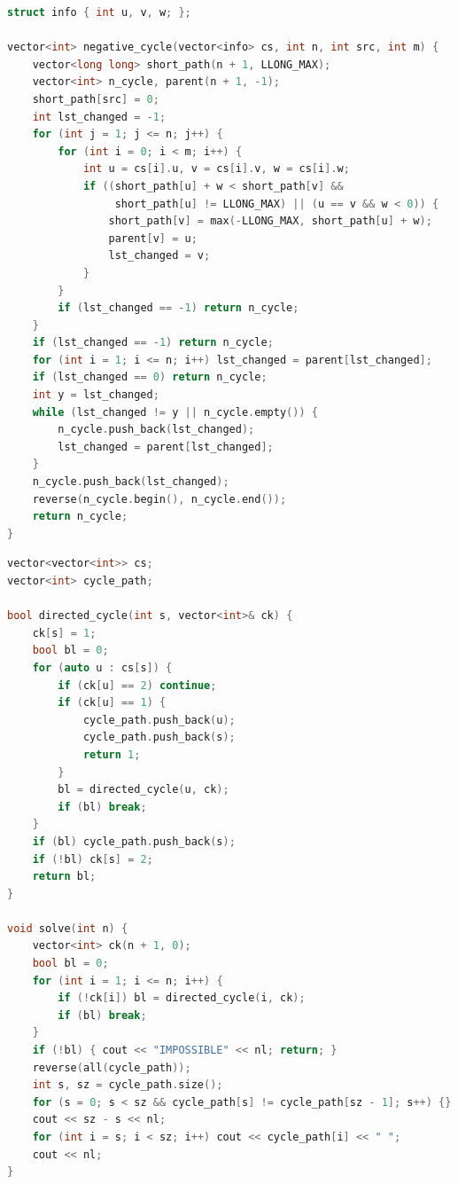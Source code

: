 \begin{lstlisting}[language=C++]
struct info { int u, v, w; };

vector<int> negative_cycle(vector<info> cs, int n, int src, int m) {
    vector<long long> short_path(n + 1, LLONG_MAX);
    vector<int> n_cycle, parent(n + 1, -1);
    short_path[src] = 0;
    int lst_changed = -1;
    for (int j = 1; j <= n; j++) {
        for (int i = 0; i < m; i++) {
            int u = cs[i].u, v = cs[i].v, w = cs[i].w;
            if ((short_path[u] + w < short_path[v] &&
                 short_path[u] != LLONG_MAX) || (u == v && w < 0)) {
                short_path[v] = max(-LLONG_MAX, short_path[u] + w);
                parent[v] = u;
                lst_changed = v;
            }
        }
        if (lst_changed == -1) return n_cycle;
    }
    if (lst_changed == -1) return n_cycle;
    for (int i = 1; i <= n; i++) lst_changed = parent[lst_changed];
    if (lst_changed == 0) return n_cycle;
    int y = lst_changed;
    while (lst_changed != y || n_cycle.empty()) {
        n_cycle.push_back(lst_changed);
        lst_changed = parent[lst_changed];
    }
    n_cycle.push_back(lst_changed);
    reverse(n_cycle.begin(), n_cycle.end());
    return n_cycle;
}
\end{lstlisting}

\begin{lstlisting}[language=C++]
vector<vector<int>> cs;
vector<int> cycle_path;

bool directed_cycle(int s, vector<int>& ck) {
    ck[s] = 1;
    bool bl = 0;
    for (auto u : cs[s]) {
        if (ck[u] == 2) continue;
        if (ck[u] == 1) {
            cycle_path.push_back(u);
            cycle_path.push_back(s);
            return 1;
        }
        bl = directed_cycle(u, ck);
        if (bl) break;
    }
    if (bl) cycle_path.push_back(s);
    if (!bl) ck[s] = 2;
    return bl;
}

void solve(int n) {
    vector<int> ck(n + 1, 0);
    bool bl = 0;
    for (int i = 1; i <= n; i++) {
        if (!ck[i]) bl = directed_cycle(i, ck);
        if (bl) break;
    }
    if (!bl) { cout << "IMPOSSIBLE" << nl; return; }
    reverse(all(cycle_path));
    int s, sz = cycle_path.size();
    for (s = 0; s < sz && cycle_path[s] != cycle_path[sz - 1]; s++) {}
    cout << sz - s << nl;
    for (int i = s; i < sz; i++) cout << cycle_path[i] << " ";
    cout << nl;
}
\end{lstlisting}

